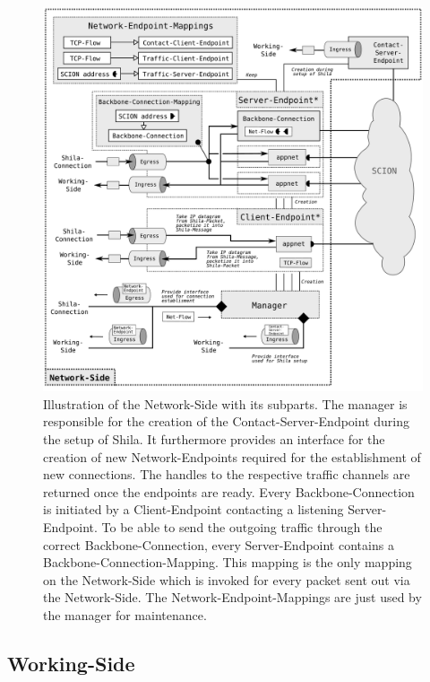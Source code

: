 \begin{figure} 
	\begin{center}
		\def\svgwidth{1\textwidth}
		\includegraphics[scale=0.2]{../illustrations/implementation/ModulesNetworkSide.pdf}   
		\caption[]{Illustration of the Network-Side with its subparts. The manager is responsible for the creation of the Contact-Server-Endpoint during the setup of Shila. It furthermore provides an interface for the creation of new Network-Endpoints required for the establishment of new connections. The handles to the respective traffic channels are returned once the endpoints are ready. Every Backbone-Connection is initiated by a Client-Endpoint contacting a listening Server-Endpoint. To be able to send the outgoing traffic through the correct Backbone-Connection, every Server-Endpoint contains a Backbone-Connection-Mapping. This mapping is the only mapping on the Network-Side which is invoked for every packet sent out via the Network-Side. The Network-Endpoint-Mappings are just used by the manager for maintenance.}
		\label{fig:ImplementationModulesNetworkSide}
	\end{center}
\end{figure}

\subsection*{Working-Side}


